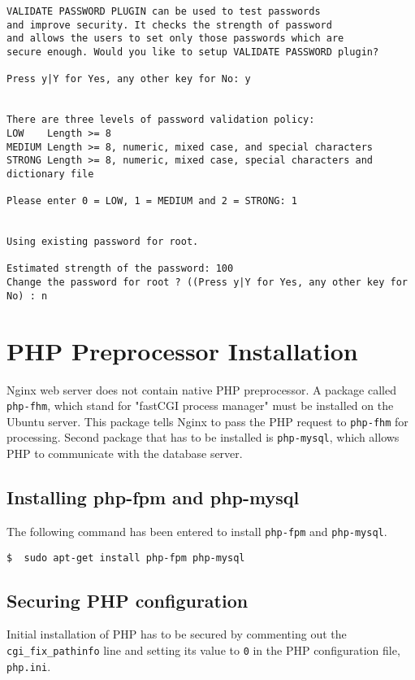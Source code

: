 \begin{lstlisting}
VALIDATE PASSWORD PLUGIN can be used to test passwords
and improve security. It checks the strength of password
and allows the users to set only those passwords which are
secure enough. Would you like to setup VALIDATE PASSWORD plugin?

Press y|Y for Yes, any other key for No: y


There are three levels of password validation policy:
LOW    Length >= 8
MEDIUM Length >= 8, numeric, mixed case, and special characters
STRONG Length >= 8, numeric, mixed case, special characters and dictionary file

Please enter 0 = LOW, 1 = MEDIUM and 2 = STRONG: 1


Using existing password for root.

Estimated strength of the password: 100
Change the password for root ? ((Press y|Y for Yes, any other key for No) : n
\end{lstlisting}

\section{PHP Preprocessor Installation} \label{sec:php-preprocessor-installation}
Nginx web server does not contain native PHP preprocessor. A package called \texttt{php-fhm}, which stand for "fastCGI process manager" must be installed on the Ubuntu server. This package tells Nginx to pass the PHP request to \texttt{php-fhm} for processing. Second package that has to be installed is \texttt{php-mysql}, which allows PHP to communicate with the database server.

\subsection{Installing php-fpm and php-mysql}
The following command has been entered to install \texttt{php-fpm} and \texttt{php-mysql}.
\begin{lstlisting}
$  sudo apt-get install php-fpm php-mysql
\end{lstlisting}

\subsection{Securing PHP configuration}
Initial installation of PHP has to be secured by commenting out the \texttt{cgi\_fix\_pathinfo} line and setting its value to \texttt{0} in the PHP configuration file, \texttt{php.ini}.

